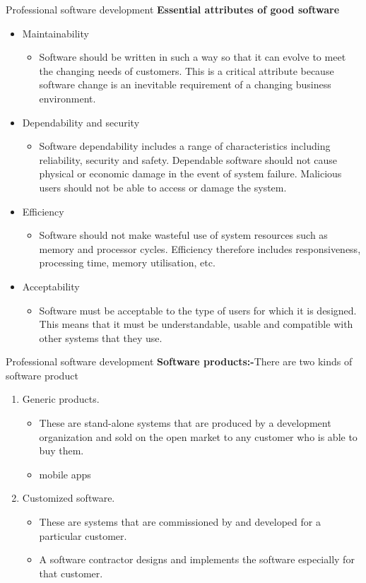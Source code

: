 \documentclass{beamer}
\begin{document}
\begin{frame}{Professional software development}
	\textbf{Essential attributes of good software}
	\begin{itemize}
		\item Maintainability
		\begin{itemize}
			\item Software should be written in such a way so that it can evolve to meet the changing needs of customers.
			This is a critical attribute because software change is an inevitable requirement of a changing business environment.		
		\end{itemize}
		\item Dependability and security
		\begin{itemize}
			\item Software dependability includes a range of characteristics including reliability, security and safety.
			Dependable software should not cause physical or economic damage in the event of system failure. Malicious users should not be  able to access or damage the system.
		\end{itemize}
		\item Efficiency
		\begin{itemize}
			\item Software should not make wasteful use of system resources such as memory and processor cycles. 
			Efficiency therefore includes responsiveness, processing time, memory utilisation, etc.
		\end{itemize}
		\item Acceptability
		\begin{itemize}
			\item Software must be acceptable to the type of users for which it is designed. 
			This means that it must be understandable, usable and compatible with other systems that they use.
		\end{itemize}
	\end{itemize}
\end{frame}
\begin{frame}{Professional software development}
	\textbf{Software products:-}There are two kinds of software product
	\begin{enumerate}
		\item Generic products.
		\begin{itemize}
			\item These are stand-alone systems that are produced by a development organization and sold on the open market to any customer who is able to buy them.
			\item mobile apps 
		\end{itemize}
	\item Customized software.
	\begin{itemize}
		\item These are systems that are commissioned by and developed for a particular      customer.
		\item A software contractor designs and implements the software especially for that  customer.
		
	\end{itemize}
	\end{enumerate}
\end{frame}
\end{document}
